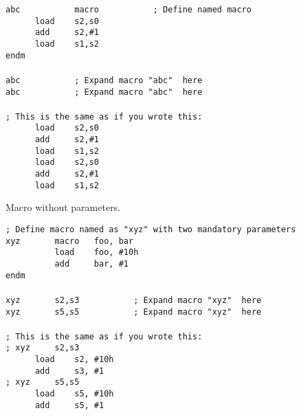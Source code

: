         {
            \usecodefont
            \verb'abc           macro           ; Define named macro '\\
            \verb'      load    s2,s0'\\
            \verb'      add     s2,#1'\\
            \verb'      load    s1,s2'\\
            \verb'endm'\\\\
            \verb'abc           ; Expand macro "abc"  here'\\
            \verb'abc           ; Expand macro "abc"  here'\\\\
            \verb'; This is the same as if you wrote this:'\\
            \verb'      load    s2,s0'\\
            \verb'      add     s2,#1'\\
            \verb'      load    s1,s2'\\
            \verb'      load    s2,s0'\\
            \verb'      add     s2,#1'\\
            \verb'      load    s1,s2'\\
        }

        Macro without parameters.

        {
            \usecodefont
            \verb'; Define macro named as "xyz" with two mandatory parameters'\\
            \verb'xyz       macro   foo, bar'\\
            \verb'          load    foo, #10h'\\
            \verb'          add     bar, #1'\\
            \verb'endm'\\\\
            \verb'xyz       s2,s3           ; Expand macro "xyz"  here'\\
            \verb'xyz       s5,s5           ; Expand macro "xyz"  here'\\\\
            \verb'; This is the same as if you wrote this:'\\
            \verb'; xyz     s2,s3'\\
            \verb'      load    s2, #10h'\\
            \verb'      add     s3, #1'\\
            \verb'; xyz     s5,s5'\\
            \verb'      load    s5, #10h'\\
            \verb'      add     s5, #1'\\
        }

